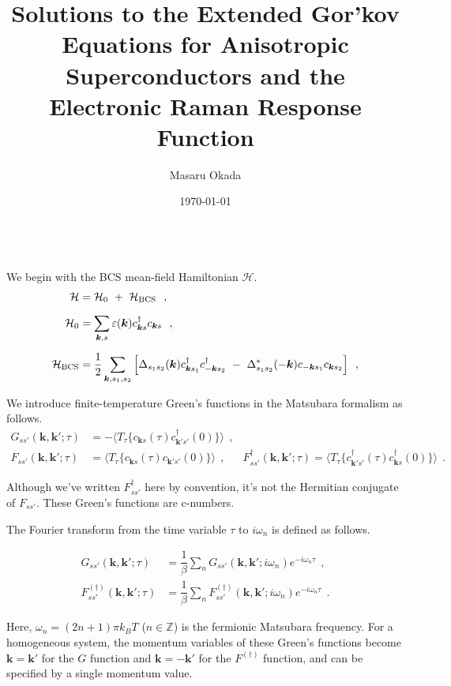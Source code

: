 \documentclass[a4j]{jsarticle}
\title{
Solutions to the Extended Gor'kov Equations for Anisotropic Superconductors and the Electronic Raman Response Function
}
\author{Masaru Okada}
\date{\today}
\begin{document}
\maketitle

\ \\[-15mm]

We begin with the BCS mean-field Hamiltonian $\mathcal{H}$.
\begin{align}
	\mathcal{H}
	&=
	\mathcal{H}_{0}
	\ + \
	\mathcal{H}_{\rm BCS}
	\ \ ,
	\nonumber \\[2mm]
	\mathcal{H}_{0}
	&=
	\sum_{\bm{k},s}
	\varepsilon(\bm{k})
	c_{\bm{k} s}^{\dagger}
	c_{\bm{k} s}
	\ \ ,
	\nonumber \\[2mm]
	\mathcal{H}_{\rm BCS}
	&=
	\dfrac{1}{2}
	\sum_{\bm{k},s_{1},s_{2}}
	\Big[
		\Delta_{ s_{1} s_{2} }( \bm{k} )
		c_{\bm{k} s_{1}}^{\dagger}
		c_{-\bm{k} s_{2}}^{\dagger}
		\ - \
		\Delta_{ s_{1} s_{2} }^{*}( - \bm{k} )
		c_{-\bm{k} s_{1}}
		c_{\bm{k} s_{2}}
		\Big]
	\ \ ,
\end{align}

We introduce finite-temperature Green's functions in the Matsubara formalism as follows.
\begin{align}
	G_{ss'}(\bm{k} , \bm{k}' ; \tau)
	&=
	-
	\langle T_{\tau} \{ c_{\bm{k}s}(\tau) c_{\bm{k}'s'}^{\dagger}(0) \} \rangle
	\ \ ,
	&\\[3mm]
	F_{ss'}(\bm{k} , \bm{k}' ; \tau)
	&=
	\langle T_{\tau} \{ c_{\bm{k}s}(\tau) c_{\bm{k}'s'}(0) \} \rangle
	\ \ , \ \
	&F_{ss'}^{\dagger}(\bm{k} , \bm{k}' ; \tau)
	=
	\langle T_{\tau} \{ c_{\bm{k}' s' }^{\dagger}(\tau) c_{\bm{k} s }^{\dagger}(0) \} \rangle
	\ \ .
\end{align}

Although we've written $F_{ss'}^{\dagger}$ here by convention, it's not the Hermitian conjugate of $F_{ss'}$.
These Green's functions are c-numbers.

The Fourier transform from the time variable $\tau$ to $i \omega_{n}$ is defined as follows.

\begin{align}
	G_{ss'}(\bm{k} , \bm{k}' ; \tau)
	&=
	\dfrac{1}{\beta} \sum_{n}
	G_{ss'}(\bm{k} , \bm{k}' ; i \omega_{n} )
	e^{- i \omega_{n} \tau }
	\ \ , \nonumber \\[2mm]
	F_{ss'}^{(\dagger)}(\bm{k} , \bm{k}' ; \tau)
	&=
	\dfrac{1}{\beta} \sum_{n}
	F_{ss'}^{(\dagger)}(\bm{k} , \bm{k}' ; i \omega_{n} )
	e^{- i \omega_{n} \tau }
	\ \ .
\end{align}

Here, $\omega_{n}=(2n+1)\pi k_{B} T$ ($n \in \mathbb{Z}$) is the fermionic Matsubara frequency.
For a homogeneous system, the momentum variables of these Green's functions become $\bm{k}=\bm{k}'$ for the $G$ function and $\bm{k}=-\bm{k}'$ for the $F^{(\dagger)}$ function, and can be specified by a single momentum value.
\end{document}

